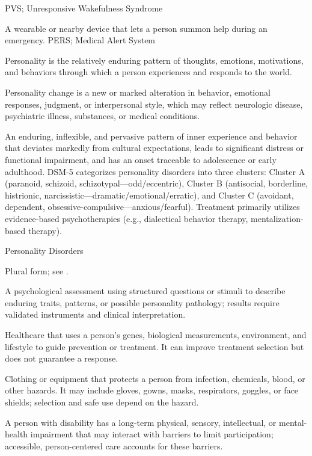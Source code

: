 \synonyms
PVS; Unresponsive Wakefulness Syndrome

 A wearable or nearby device that lets a person summon help during an emergency.
\synonyms
PERS; Medical Alert System

 Personality is the relatively enduring pattern of thoughts, emotions, motivations, and behaviors through which a person experiences and responds to the world.

 Personality change is a new or marked alteration in behavior, emotional responses, judgment, or interpersonal style, which may reflect neurologic disease, psychiatric illness, substances, or medical conditions.

 An enduring, inflexible, and pervasive pattern of inner experience and behavior that deviates markedly from cultural expectations, leads to significant distress or functional impairment, and has an onset traceable to adolescence or early adulthood. DSM-5 categorizes personality disorders into three clusters: Cluster A (paranoid, schizoid, schizotypal---odd/eccentric), Cluster B (antisocial, borderline, histrionic, narcissistic---dramatic/emotional/erratic), and Cluster C (avoidant, dependent, obsessive-compulsive---anxious/fearful). Treatment primarily utilizes evidence-based psychotherapies (e.g., dialectical behavior therapy, mentalization-based therapy).

\synonyms
Personality Disorders

 Plural form; see .

 A psychological assessment using structured questions or stimuli to describe enduring traits, patterns, or possible personality pathology; results require validated instruments and clinical interpretation.

 Healthcare that uses a person's genes, biological measurements, environment, and lifestyle to guide prevention or treatment. It can improve treatment selection but does not guarantee a response.

 Clothing or equipment that protects a person from infection, chemicals, blood, or other hazards. It may include gloves, gowns, masks, respirators, goggles, or face shields; selection and safe use depend on the hazard.

 A person with disability has a long-term physical, sensory, intellectual, or mental-health impairment that may interact with barriers to limit participation; accessible, person-centered care accounts for these barriers.

